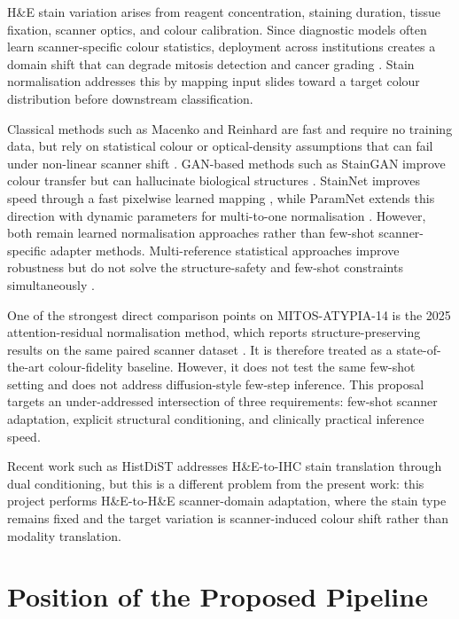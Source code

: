 \documentclass[a4paper,twoside,12pt]{report}
\begin{document}
H\&E stain variation arises from reagent concentration, staining duration, tissue fixation, scanner optics, and colour calibration. Since diagnostic models often learn scanner-specific colour statistics, deployment across institutions creates a domain shift that can degrade mitosis detection and cancer grading \citep{breen2024gans}. Stain normalisation addresses this by mapping input slides toward a target colour distribution before downstream classification.

Classical methods such as Macenko and Reinhard are fast and require no training data, but rely on statistical colour or optical-density assumptions that can fail under non-linear scanner shift \citep{macenko2009normalisation,reinhard2001colortransfer}. GAN-based methods such as StainGAN improve colour transfer but can hallucinate biological structures \citep{shaban2019staingan}. StainNet improves speed through a fast pixelwise learned mapping \citep{kang2021stainnet}, while ParamNet extends this direction with dynamic parameters for multi-to-one normalisation \citep{kang2024paramnet}. However, both remain learned normalisation approaches rather than few-shot scanner-specific adapter methods. Multi-reference statistical approaches improve robustness but do not solve the structure-safety and few-shot constraints simultaneously \citep{ivanov2024multitarget}.

One of the strongest direct comparison points on MITOS-ATYPIA-14 is the 2025 attention-residual normalisation method, which reports structure-preserving results on the same paired scanner dataset \citep{madusanka2025attentionresidual}. It is therefore treated as a state-of-the-art colour-fidelity baseline. However, it does not test the same few-shot setting and does not address diffusion-style few-step inference. This proposal targets an under-addressed intersection of three requirements: few-shot scanner adaptation, explicit structural conditioning, and clinically practical inference speed.

Recent work such as HistDiST \citep{grosskopf2025histdist} addresses H\&E-to-IHC stain translation through dual conditioning, but this is a different problem from the present work: this project performs H\&E-to-H\&E scanner-domain adaptation, where the stain type remains fixed and the target variation is scanner-induced colour shift rather than modality translation.
\newpage
\section{Position of the Proposed Pipeline}
\end{document}
